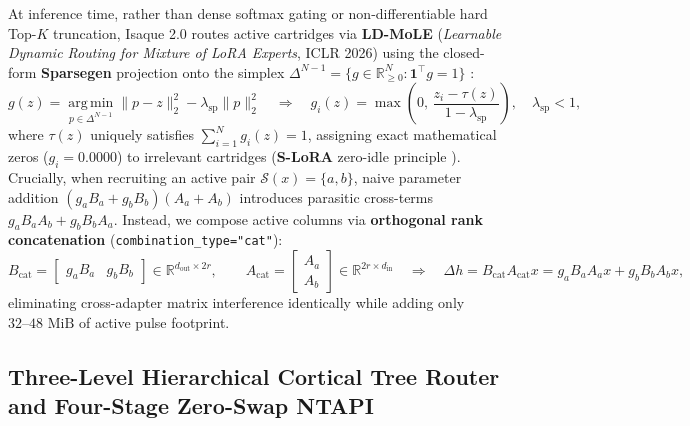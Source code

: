 \documentclass[10pt,a4paper]{article}
\begin{document}
At inference time, rather than dense softmax gating or non-differentiable hard Top-$K$ truncation, Isaque 2.0 routes active cartridges via \textbf{LD-MoLE} (\textit{Learnable Dynamic Routing for Mixture of LoRA Experts}, ICLR 2026) \cite{zhuang2026ldmole} using the closed-form \textbf{Sparsegen} projection onto the simplex $\Delta^{N-1} = \{g \in \mathbb{R}_{\ge 0}^N : \mathbf{1}^\top g = 1\}$ \cite{laha2018sparsegen}:
\begin{equation}
  g(z) = \operatorname*{arg\,min}_{p \in \Delta^{N-1}} \|p - z\|_2^2 - \lambda_{\text{sp}} \|p\|_2^2 \quad \Longrightarrow \quad g_i(z) = \max\!\left(0,\, \frac{z_i - \tau(z)}{1 - \lambda_{\text{sp}}}\right), \quad \lambda_{\text{sp}} < 1,
  \label{eq:sparsegen}
\end{equation}
where $\tau(z)$ uniquely satisfies $\sum_{i=1}^N g_i(z) = 1$, assigning exact mathematical zeros ($g_i = 0.0000$) to irrelevant cartridges (\textbf{S-LoRA} zero-idle principle \cite{sheng2024slora}). Crucially, when recruiting an active pair $\mathcal{S}(x) = \{a, b\}$, naive parameter addition $(g_a B_a + g_b B_b)(A_a + A_b)$ introduces parasitic cross-terms $g_a B_a A_b + g_b B_b A_a$. Instead, we compose active columns via \textbf{orthogonal rank concatenation} (\texttt{combination\_\allowbreak{}type="cat"}):
\begin{equation}
  B_{\text{cat}} = \begin{bmatrix} g_a B_a & g_b B_b \end{bmatrix} \in \mathbb{R}^{d_{\text{out}} \times 2r}, \qquad
  A_{\text{cat}} = \begin{bmatrix} A_a \\ A_b \end{bmatrix} \in \mathbb{R}^{2r \times d_{\text{in}}} \quad \Longrightarrow \quad
  \Delta h = B_{\text{cat}} A_{\text{cat}} x = g_a B_a A_a x + g_b B_b A_b x,
  \label{eq:cat}
\end{equation}
eliminating cross-adapter matrix interference identically while adding only $32\text{--}48\text{ MiB}$ of active pulse footprint.

\subsection{Three-Level Hierarchical Cortical Tree Router and Four-Stage Zero-Swap NTAPI}
\end{document}
